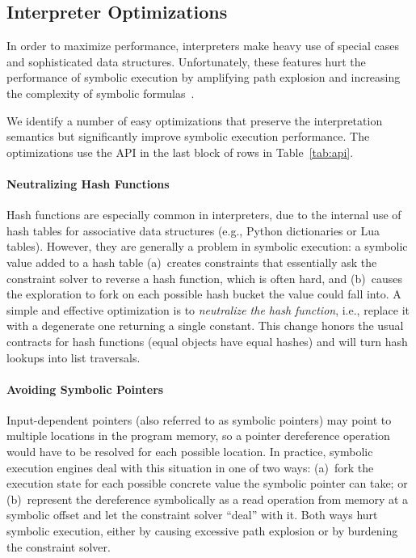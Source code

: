 \subsection{Interpreter Optimizations}
\label{sec:chef:optimzeforsymbex}

In order to maximize performance, interpreters make heavy use of special cases and sophisticated data structures.  Unfortunately, these features hurt the performance of symbolic execution by amplifying path explosion and increasing the complexity of symbolic formulas~\cite{overify}.

We identify a number of easy optimizations that preserve the interpretation semantics but significantly improve symbolic execution performance.  The optimizations use the \chef API in the last block of rows in Table~\ref{tab:api}.

\paragraph{Neutralizing Hash Functions}

Hash functions are especially common in interpreters, due to the internal use of hash tables for associative data structures (e.g., Python dictionaries or Lua tables).  However, they are generally a problem in symbolic execution: a symbolic value added to a hash table (a)~creates constraints that essentially ask the constraint solver to reverse a hash function, which is often hard, and (b)~causes the exploration to fork on each possible hash bucket the value could fall into.
%
A simple and effective optimization is to \emph{neutralize the hash function}, i.e., replace it with a degenerate one returning a single constant. This change honors the usual contracts for hash functions (equal objects have equal hashes) and will turn hash lookups into list traversals.

\paragraph{Avoiding Symbolic Pointers}

Input-dependent pointers (also referred to as symbolic pointers) may point to multiple locations in the program memory, so a pointer dereference operation would have to be resolved for each possible location.  In practice, symbolic execution engines deal with this situation in one of two ways:
%
(a)~fork the execution state for each possible concrete value the symbolic pointer can take; or
%
(b)~represent the dereference symbolically as a read operation from memory at a symbolic offset and let the constraint solver ``deal'' with it.
%
Both ways hurt symbolic execution, either by causing excessive path explosion or by burdening the constraint solver.

